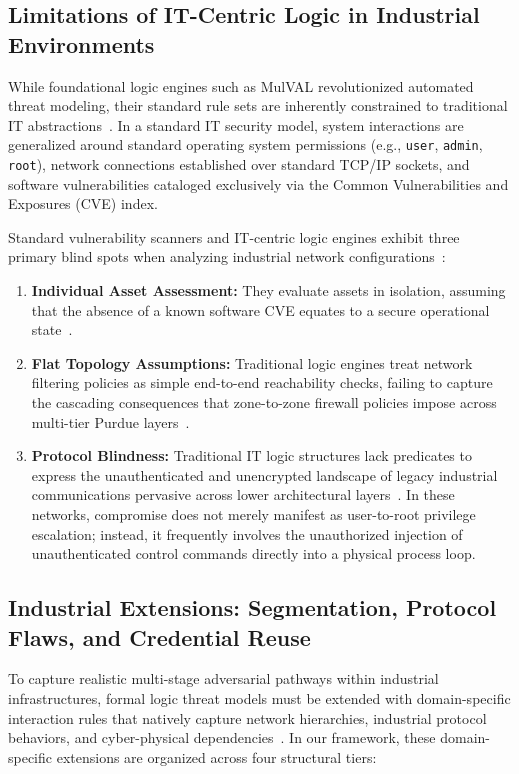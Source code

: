 \documentclass[target=mst,aauheader=aics,style=]{thud}
\begin{document}
\subsection{Limitations of IT-Centric Logic in Industrial Environments}
\label{sec:mulval_it_limitations}
While foundational logic engines such as MulVAL revolutionized automated threat modeling, their standard rule sets are inherently constrained to traditional IT abstractions~\cite{Ou05, StanExtended}. In a standard IT security model, system interactions are generalized around standard operating system permissions (e.g., \texttt{user}, \texttt{admin}, \texttt{root}), network connections established over standard TCP/IP sockets, and software vulnerabilities cataloged exclusively via the Common Vulnerabilities and Exposures (CVE) index.

Standard vulnerability scanners and IT-centric logic engines exhibit three primary blind spots when analyzing industrial network configurations~\cite{SunderOT}:
\begin{enumerate}
    \item \textbf{Individual Asset Assessment:} They evaluate assets in isolation, assuming that the absence of a known software CVE equates to a secure operational state~\cite{Ou05}.
    \item \textbf{Flat Topology Assumptions:} Traditional logic engines treat network filtering policies as simple end-to-end reachability checks, failing to capture the cascading consequences that zone-to-zone firewall policies impose across multi-tier Purdue layers~\cite{SunderOT}.
    \item \textbf{Protocol Blindness:} Traditional IT logic structures lack predicates to express the unauthenticated and unencrypted landscape of legacy industrial communications pervasive across lower architectural layers~\cite{StanExtended}. In these networks, compromise does not merely manifest as user-to-root privilege escalation; instead, it frequently involves the unauthorized injection of unauthenticated control commands directly into a physical process loop.
\end{enumerate}

\subsection{Industrial Extensions: Segmentation, Protocol Flaws, and Credential Reuse}
\label{sec:industrial_logic_extensions}
To capture realistic multi-stage adversarial pathways within industrial infrastructures, formal logic threat models must be extended with domain-specific interaction rules that natively capture network hierarchies, industrial protocol behaviors, and cyber-physical dependencies~\cite{StanExtended, SunderOT}. In our framework, these domain-specific extensions are organized across four structural tiers:
\end{document}
